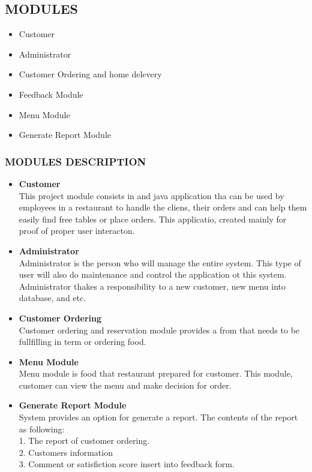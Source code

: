 \documentclass[12pt,a4paper]{article}
\begin{document}
	\subsection{MODULES}
		\begin{itemize}
			\item Customer
			\item Administrator
			\item Customer Ordering and home delevery
			\item Feedback Module
			\item Menu Module
			\item Generate Report Module
		\end{itemize}
		\subsubsection{MODULES DESCRIPTION}
		\begin{itemize}
			\item {\bfseries Customer} \\
			This project module consists in and java application tha can be used by employees in a restaurant to handle the cliens, their orders and can help them easily find free tables or place orders. This applicatio, created mainly for proof of proper user interacton.
			\item {\bfseries Administrator} \\
			Administrator is the person who will manage the entire system. This type of user will also do maintenance and control the application ot this system. Administrator thakes a responsibility to a new customer, new menu into database, and etc.
			\item {\bfseries Customer Ordering} \\
			Customer ordering and reservation module provides a from that needs to be fullfilling in term or ordering food.
			\item {\bfseries Menu Module } \\
			Menu module is food that restaurant prepared for customer. This module, customer can view the menu and make decision for order.
			\item {\bfseries Generate Report Module} \\
			System provides an option for generate a report. The contents of the report as following: \\
			1. The report of customer ordering. \\
			2. Customers information \\
			3. Comment or satisfiction score insert into feedback form.	
		\end{itemize}
\end{document}
